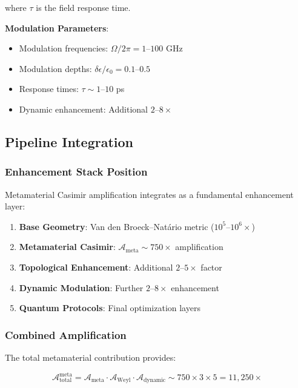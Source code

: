 where $\tau$ is the field response time.

\textbf{Modulation Parameters}:
\begin{itemize}
\item Modulation frequencies: $\Omega/2\pi = 1$--$100$ GHz
\item Modulation depths: $\delta\epsilon/\epsilon_0 = 0.1$--$0.5$
\item Response times: $\tau \sim 1$--$10$ ps
\item Dynamic enhancement: Additional $2$--$8\times$
\end{itemize}

\subsection{Pipeline Integration}

\subsubsection{Enhancement Stack Position}

Metamaterial Casimir amplification integrates as a fundamental enhancement layer:

\begin{enumerate}
\item \textbf{Base Geometry}: Van den Broeck–Natário metric ($10^5$--$10^6\times$)
\item \textbf{Metamaterial Casimir}: $\mathcal{A}_{\text{meta}} \sim 750\times$ amplification
\item \textbf{Topological Enhancement}: Additional $2$--$5\times$ factor
\item \textbf{Dynamic Modulation}: Further $2$--$8\times$ enhancement
\item \textbf{Quantum Protocols}: Final optimization layers
\end{enumerate}

\subsubsection{Combined Amplification}

The total metamaterial contribution provides:

\begin{equation}
\mathcal{A}_{\text{total}}^{\text{meta}} = \mathcal{A}_{\text{meta}} \cdot \mathcal{A}_{\text{Weyl}} \cdot \mathcal{A}_{\text{dynamic}} \sim 750 \times 3 \times 5 = 11,250\times
\end{equation}


